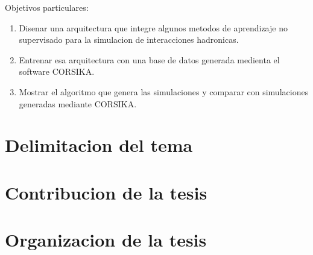 Objetivos particulares:
\renewcommand{\theenumi}{\roman{enumi}}%
\begin{enumerate}
    \item Disenar una arquitectura que integre algunos metodos de aprendizaje no supervisado para la simulacion de interacciones hadronicas.
    \item Entrenar esa arquitectura con una base de datos generada medienta el software CORSIKA.
    \item Mostrar el algoritmo que genera las simulaciones y comparar con simulaciones generadas mediante CORSIKA.
\end{enumerate}

\section{Delimitacion del tema}


\section{Contribucion de la tesis}


\section{Organizacion de la tesis}
